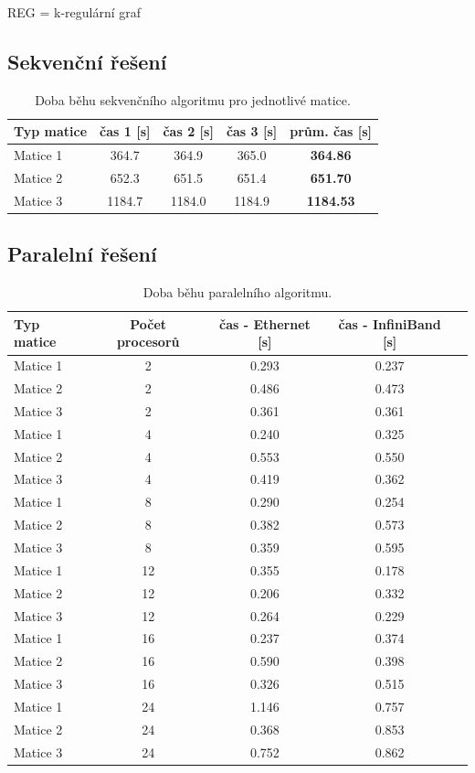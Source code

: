 \documentclass[12pt]{article}
\begin{document}
REG = k-regulární graf

\subsection{Sekvenční řešení}

\begin{table}[ht]
\centering
\begin{tabular}{|l|c|c|c|c|}
\hline \textbf{Typ matice} & \textbf{čas 1 [s]} & \textbf{čas 2 [s]} & \textbf{čas 3 [s]} & \textbf{prům. čas [s]} \\
\hline 
\hline Matice 1 & 364.7 & 364.9 & 365.0 & \textbf{364.86} \\ 
\hline Matice 2 & 652.3 & 651.5 & 651.4 & \textbf{651.70} \\ 
\hline Matice 3 & 1184.7 & 1184.0 & 1184.9 & \textbf{1184.53} \\ 
\hline 
\end{tabular}
\caption{Doba běhu sekvenčního algoritmu pro jednotlivé matice.}
\label{doba_behu_sekvencne}	
\end{table}

\newpage
\subsection{Paralelní řešení}
\begin{table}[ht]
\centering
\begin{tabular}{|l|c|c|c|c|}
\hline \textbf{Typ matice} & \textbf{Počet procesorů} & \textbf{čas - Ethernet [s]} & \textbf{čas - InfiniBand [s]} \\
\hline 
\hline Matice 1 & 2 & 0.293 & 0.237 \\ 
\hline Matice 2 & 2 & 0.486 & 0.473 \\ 
\hline Matice 3 & 2 & 0.361 & 0.361 \\ 
\hline
\hline Matice 1 & 4 & 0.240 & 0.325 \\ 
\hline Matice 2 & 4 & 0.553 & 0.550 \\ 
\hline Matice 3 & 4 & 0.419 & 0.362 \\ 
\hline 
\hline Matice 1 & 8 & 0.290 & 0.254 \\ 
\hline Matice 2 & 8 & 0.382 & 0.573 \\ 
\hline Matice 3 & 8 & 0.359 & 0.595 \\ 
\hline 
\hline Matice 1 & 12 & 0.355 & 0.178 \\ 
\hline Matice 2 & 12 & 0.206 & 0.332 \\ 
\hline Matice 3 & 12 & 0.264 & 0.229 \\ 
\hline 
\hline Matice 1 & 16 & 0.237 & 0.374 \\ 
\hline Matice 2 & 16 & 0.590 & 0.398 \\ 
\hline Matice 3 & 16 & 0.326 & 0.515 \\ 
\hline 
\hline Matice 1 & 24 & 1.146 & 0.757 \\ 
\hline Matice 2 & 24 & 0.368 & 0.853 \\ 
\hline Matice 3 & 24 & 0.752 & 0.862 \\ 
\hline 
\end{tabular}
\caption{Doba běhu paralelního algoritmu.}
\label{doba_behu_paralelne}	
\end{table}
\end{document}
